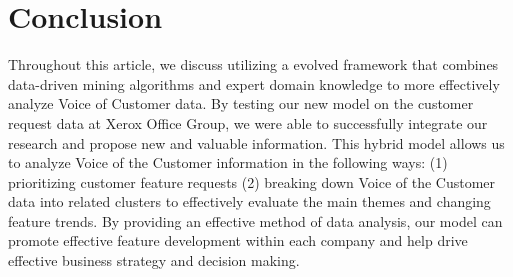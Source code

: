 \documentclass[sigconf]{acmart}
\begin{document}
\section{Conclusion}
Throughout this article, we discuss utilizing a evolved framework that combines data-driven mining algorithms and expert domain knowledge to more effectively analyze Voice of Customer data. By testing our new model on the customer request data at Xerox Office Group, we were able to successfully integrate our research and propose new and valuable information. This hybrid model allows us to analyze Voice of the Customer information in the following ways: (1) prioritizing customer feature requests (2) breaking down Voice of the Customer data into related clusters to effectively evaluate the main themes and changing feature trends. By providing an effective method of data analysis, our model can promote effective feature development within each company and help drive effective business strategy and decision making.



\end{document}

